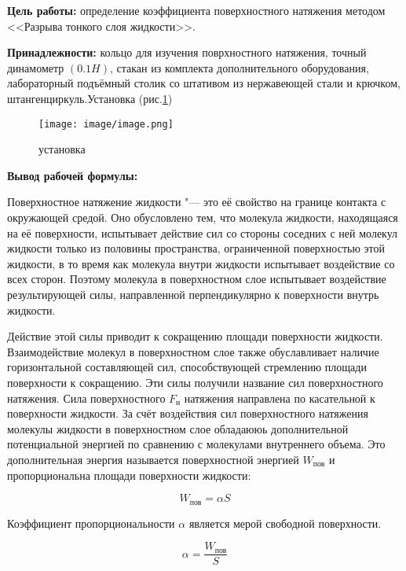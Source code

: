 \textbf{Цель работы:} определение коэффициента поверхностного натяжения методом <<Разрыва тонкого слоя жидкости>>.

\textbf{Принадлежности:} кольцо для изучения поврхностного натяжения, точный динамометр $(0.1H)$, стакан из комплекта дополнительного оборудования, лабораторный подъёмный столик со штативом из нержавеющей стали и крючком, штангенциркуль.Установка (рис.\ref{fig:installation})

\begin{figure}[!h]
    \centering
    \texttt{[image: image/image.png]}
    \caption{установка}
    \label{fig:installation}
\end{figure}

\textbf{Вывод рабочей формулы:}

Поверхностное натяжение жидкости "--- это её свойство на границе контакта с окружающей средой. Оно обусловлено тем, что молекула жидкости, находящаяся на её поверхности, испытывает действие сил со стороны соседних с ней молекул жидкости только из половины пространства, ограниченной поверхностью этой жидкости, в то время как молекула внутри жидкости испытывает воздействие со всех сторон. Поэтому молекула в поверхностном слое испытывает воздействие результирующей силы, направленной перпендикулярно к поверхности внутрь жидкости.

Действие этой силы приводит к сокращению площади поверхности жидкости. Взаимодействие молекул в поверхностном слое также обуславливает наличие горизонтальной составляющей сил, способствующей стремлению площади поверхности к сокращению. Эти силы получили название сил поверхностного натяжения. Сила поверхностного $F_\text{н}$ натяжения направлена по касательной к поверхности жидкости. За счёт воздействия сил поверхностного натяжения молекулы жидкости в поверхностном слое обладаююь дополнительной потенциальной энергией по сравнению с молекулами внутреннего объема. Это дополнительная энергия называется поверхностной энергией $W_\text{пов}$ и пропорциональна площади поверхности жидкости:

\begin{equation*}
    W_\text{пов} = \alpha S
\end{equation*}

Коэффициент пропорциональности $\alpha$ является мерой свободной поверхности.

\begin{equation*}
    \alpha = \frac{W_\text{пов}}{S}
\end{equation*}

